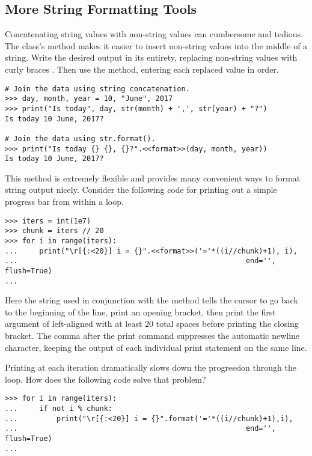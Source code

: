 \subsection*{More String Formatting Tools} %

Concatenating string values with non-string values can cumbersome and tedious.
The  class's  method makes it easier to insert non-string values into the middle of a string.
Write the desired output in its entirety, replacing non-string values with curly braces \li{\{\}}.
Then use the  method, entering each replaced value in order.

\begin{lstlisting}
# Join the data using string concatenation.
>>> day, month, year = 10, "June", 2017
>>> print("Is today", day, str(month) + ',', str(year) + "?")
Is today 10 June, 2017?

# Join the data using str.format().
>>> print("Is today {} {}, {}?".<<format>>(day, month, year))
Is today 10 June, 2017?
\end{lstlisting}

This method is extremely flexible and provides many convenient ways to format string output nicely.
Consider the following code for printing out a simple progress bar from within a loop.

\begin{lstlisting}
>>> iters = int(1e7)
>>> chunk = iters // 20
>>> for i in range(iters):
...     print("\r[{:<20}] i = {}".<<format>>('='*((i//chunk)+1), i),
...                                                     end='', flush=True)
...
\end{lstlisting}

Here the string  used in conjunction with the  method tells the cursor to go back to the beginning of the line, print an opening bracket, then print the first argument of  left-aligned with at least $20$ total spaces before printing the closing bracket.
The comma after the print command suppresses the automatic newline character, keeping the output of each individual print statement on the same line.

Printing at each iteration dramatically slows down the progression through the loop.
How does the following code solve that problem?

\begin{lstlisting}
>>> for i in range(iters):
...     if not i % chunk:
...         print("\r[{:<20}] i = {}".format('='*((i//chunk)+1),i),
...                                                     end='', flush=True)
...
\end{lstlisting}

